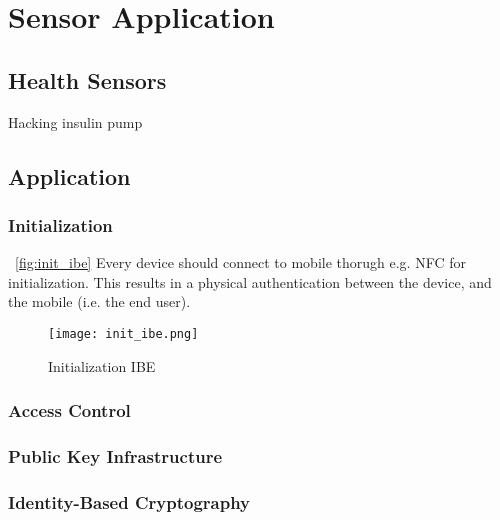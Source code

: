 \chapter{Sensor Application}

\section{Health Sensors}
Hacking insulin pump~\cite{radcliffe2011hacking}
\section{Application}

\subsection{Initialization}
~\autoref{fig:init_ibe}
Every device should connect to mobile thorugh e.g. \gls{NFC} for initialization.
This results in a physical authentication between the device, and the mobile (i.e. the end user).
\begin{figure}[ht]
  \centering
  \texttt{[image: init\_ibe.png]}
  \caption{Initialization IBE}
  \label{fig:init_ibe}
\end{figure}



\subsection{Access Control}

\subsection{Public Key Infrastructure}

\subsection{Identity-Based Cryptography}